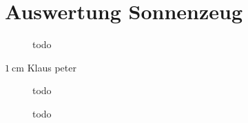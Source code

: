 \section{Auswertung Sonnenzeug}
\begin{figure}[H]
    \centering
    
    \caption{todo}
    \label{fig:Sonnenabbild}
\end{figure}
$\SI{1}{\centi \metre}$ Klaus peter
\begin{figure}[H]
    \centering
    
    \caption{todo}
    \label{fig:Sonnenkreuz_Az}
\end{figure}

\begin{figure}[H]
    \centering
    
    \caption{todo}
    \label{fig:Sonnenkreuz_Alt}
\end{figure}
